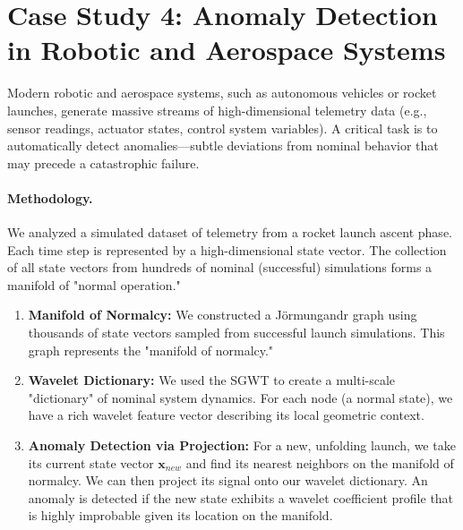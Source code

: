\section{Case Study 4: Anomaly Detection in Robotic and Aerospace Systems}
\label{sec:robotics}
Modern robotic and aerospace systems, such as autonomous vehicles or rocket launches, generate massive streams of high-dimensional telemetry data (e.g., sensor readings, actuator states, control system variables). A critical task is to automatically detect anomalies—subtle deviations from nominal behavior that may precede a catastrophic failure.

\paragraph{Methodology.} We analyzed a simulated dataset of telemetry from a rocket launch ascent phase. Each time step is represented by a high-dimensional state vector. The collection of all state vectors from hundreds of nominal (successful) simulations forms a manifold of "normal operation."
\begin{enumerate}
    \item \textbf{Manifold of Normalcy:} We constructed a Jörmungandr graph using thousands of state vectors sampled from successful launch simulations. This graph represents the "manifold of normalcy."
    \item \textbf{Wavelet Dictionary:} We used the SGWT to create a multi-scale "dictionary" of nominal system dynamics. For each node (a normal state), we have a rich wavelet feature vector describing its local geometric context.
    \item \textbf{Anomaly Detection via Projection:} For a new, unfolding launch, we take its current state vector $\bm{x}_{new}$ and find its nearest neighbors on the manifold of normalcy. We can then project its signal onto our wavelet dictionary. An anomaly is detected if the new state exhibits a wavelet coefficient profile that is highly improbable given its location on the manifold.
\end{enumerate}

